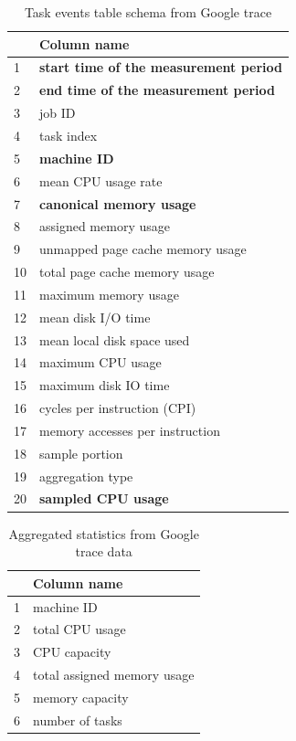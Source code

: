 \documentclass[]{final_report}
\begin{document}
\begin{table}[h]
\begin{center}
    \begin{tabular}{| l | l |}
    \hline
    & \textbf{Column name} \\
    \hline
    1 & \textbf{start time of the measurement period}\\
    \hline
    2 & \textbf{end time of the measurement period}\\
     \hline
    3 & job ID\\
     \hline
    4 & task index\\
     \hline
    5 & \textbf{machine ID} \\
     \hline
    6 & mean CPU usage rate \\
    \hline
    7 & \textbf{canonical memory usage}\\
    \hline
    8 & assigned memory usage\\
    \hline
    9 & unmapped page cache memory usage\\
    \hline
    10 & total page cache memory usage\\
    \hline
    11 & maximum memory usage\\
    \hline
    12 & mean disk I/O time\\
    \hline
    13 & mean local disk space used\\
    \hline
    14 & maximum CPU usage\\
    \hline
    15 & maximum disk IO time\\
    \hline
    16 & cycles per instruction (CPI)\\
    \hline
    17 & memory accesses per instruction\\
    \hline
    18 & sample portion\\
    \hline
    19 & aggregation type \\
    \hline    
    20 & \textbf{sampled CPU usage}\\
    \hline
    \end{tabular}
\end{center}
\caption{Task events table schema from Google trace}
\label{tab:task_events}
\end{table}

\begin{table}[h]
\begin{center}
    \begin{tabular}{| l | l |}
    \hline
    & \textbf{Column name} \\
    \hline
    1& machine ID\\
    \hline
    2 & total CPU usage\\
     \hline
    3 & CPU capacity\\
     \hline
    4 & total assigned memory usage\\
     \hline
    5 & memory capacity\\
     \hline
    6 & number of tasks\\
    \hline
    \end{tabular}
\end{center}
\caption{Aggregated statistics from Google trace data}
\label{tab:new_schema}
\end{table}
\end{document}
